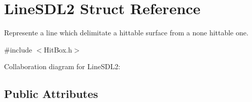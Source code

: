 \hypertarget{structLineSDL2}{}\section{Line\+S\+D\+L2 Struct Reference}
\label{structLineSDL2}


Represente a line which delimitate a hittable surface from a none hittable one.  




{\ttfamily \#include $<$Hit\+Box.\+h$>$}



Collaboration diagram for Line\+S\+D\+L2\+:
\subsection*{Public Attributes}
